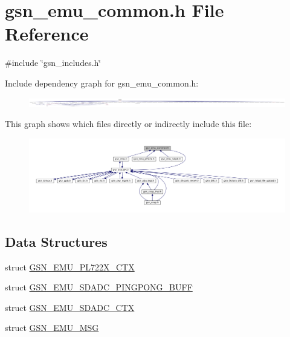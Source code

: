 \hypertarget{a00490}{
\section{gsn\_\-emu\_\-common.h File Reference}
\label{a00490}
}
{\ttfamily \#include \char`\"{}gsn\_\-includes.h\char`\"{}}\par
Include dependency graph for gsn\_\-emu\_\-common.h:
\nopagebreak
\begin{figure}[H]
\begin{center}
\leavevmode
\includegraphics[width=400pt]{a00720}
\end{center}
\end{figure}
This graph shows which files directly or indirectly include this file:
\nopagebreak
\begin{figure}[H]
\begin{center}
\leavevmode
\includegraphics[width=400pt]{a00721}
\end{center}
\end{figure}
\subsection*{Data Structures}
\begin{DoxyCompactItemize}
\item 
struct \hyperlink{a00065}{GSN\_\-EMU\_\-PL722X\_\-CTX}
\item 
struct \hyperlink{a00067}{GSN\_\-EMU\_\-SDADC\_\-PINGPONG\_\-BUFF}
\item 
struct \hyperlink{a00066}{GSN\_\-EMU\_\-SDADC\_\-CTX}
\item 
struct \hyperlink{a00062}{GSN\_\-EMU\_\-MSG}
\end{DoxyCompactItemize}
